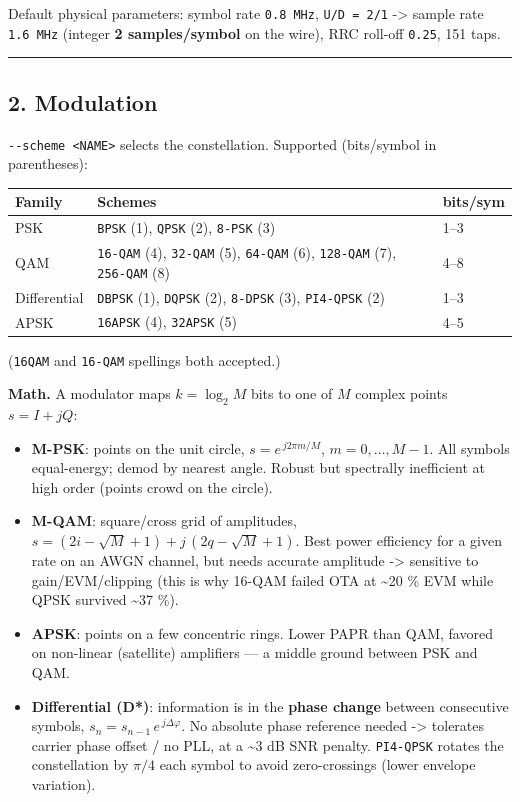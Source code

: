\documentclass[
  10pt,
]{article}
\providecommand{\tightlist}{%
  \setlength{\itemsep}{0pt}\setlength{\parskip}{0pt}}
\begin{document}
Default physical parameters: symbol rate \texttt{0.8\ MHz},
\texttt{U/D\ =\ 2/1} -\textgreater{} sample rate \texttt{1.6\ MHz}
(integer \textbf{2 samples/symbol} on the wire), RRC roll-off
\texttt{0.25}, 151 taps.

\begin{center}\rule{0.5\linewidth}{0.5pt}\end{center}

\hypertarget{2-modulation}{%
\subsection{2. Modulation}\label{2-modulation}}

\texttt{-\/-scheme\ \textless{}NAME\textgreater{}} selects the
constellation. Supported (bits/symbol in parentheses):

\begin{longtable}[]{@{}lll@{}}
\toprule
Family & Schemes & bits/sym \\
\midrule
\endhead
PSK & \texttt{BPSK} (1), \texttt{QPSK} (2), \texttt{8-PSK} (3) & 1--3 \\
QAM & \texttt{16-QAM} (4), \texttt{32-QAM} (5), \texttt{64-QAM} (6),
\texttt{128-QAM} (7), \texttt{256-QAM} (8) & 4--8 \\
Differential & \texttt{DBPSK} (1), \texttt{DQPSK} (2), \texttt{8-DPSK}
(3), \texttt{PI4-QPSK} (2) & 1--3 \\
APSK & \texttt{16APSK} (4), \texttt{32APSK} (5) & 4--5 \\
\bottomrule
\end{longtable}

(\texttt{16QAM} and \texttt{16-QAM} spellings both accepted.)

\textbf{Math.} A modulator maps \(k=\log_2 M\) bits to one of \(M\)
complex points \(s = I + jQ\):

\begin{itemize}
\tightlist
\item
  \textbf{M-PSK}: points on the unit circle, \(s = e^{\,j2\pi m/M}\),
  \(m=0,\dots,M-1\). All symbols equal-energy; demod by nearest angle.
  Robust but spectrally inefficient at high order (points crowd on the
  circle).
\item
  \textbf{M-QAM}: square/cross grid of amplitudes,
  \(s = (2i-\sqrt{M}+1) + j\,(2q-\sqrt{M}+1)\). Best power efficiency
  for a given rate on an AWGN channel, but needs accurate amplitude
  -\textgreater{} sensitive to gain/EVM/clipping (this is why 16-QAM
  failed OTA at \textasciitilde20 \% EVM while QPSK survived
  \textasciitilde37 \%).
\item
  \textbf{APSK}: points on a few concentric rings. Lower PAPR than QAM,
  favored on non-linear (satellite) amplifiers --- a middle ground
  between PSK and QAM.
\item
  \textbf{Differential (D*)}: information is in the \textbf{phase
  change} between consecutive symbols,
  \(s_n = s_{n-1}\,e^{\,j\Delta\varphi}\). No absolute phase reference
  needed -\textgreater{} tolerates carrier phase offset / no PLL, at a
  \textasciitilde3 dB SNR penalty. \texttt{PI4-QPSK} rotates the
  constellation by \(\pi/4\) each symbol to avoid zero-crossings (lower
  envelope variation).
\end{itemize}
\end{document}
